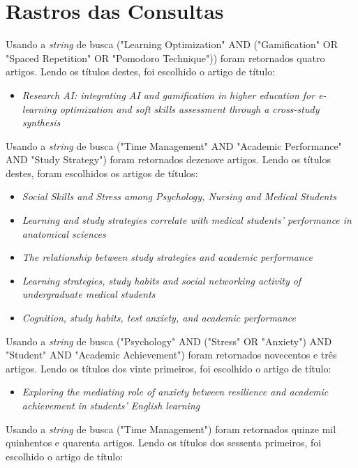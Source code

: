 \section{Rastros das Consultas}

Usando a \textit{string} de busca ("Learning Optimization" AND ("Gamification" OR "Spaced Repetition" OR "Pomodoro Technique")) foram retornados quatro artigos.
Lendo os títulos destes, foi escolhido o artigo de título:

\begin{itemize}
    \item \textit{Research AI: integrating AI and gamification in higher education for e-learning optimization and soft skills assessment through a cross-study synthesis}
\end{itemize}

Usando a \textit{string} de busca ("Time Management" AND "Academic Performance" AND "Study Strategy") foram retornados dezenove artigos.
Lendo os títulos destes, foram escolhidos os artigos de títulos:

\begin{itemize}
    \item \textit{Social Skills and Stress among Psychology, Nursing and Medical Students}
    \item \textit{Learning and study strategies correlate with medical students' performance in anatomical sciences}
    \item \textit{The relationship between study strategies and academic performance}
    \item \textit{Learning strategies, study habits and social networking activity of undergraduate medical students}
    \item \textit{Cognition, study habits, test anxiety, and academic performance}
\end{itemize}

Usando a \textit{string} de busca ("Psychology" AND ("Stress" OR "Anxiety") AND "Student" AND "Academic Achievement") foram retornados novecentos e três artigos.
Lendo os títulos dos vinte primeiros, foi escolhido o artigo de título:

\begin{itemize}
    \item \textit{Exploring the mediating role of anxiety between resilience and academic achievement in students' English learning}
\end{itemize}

Usando a \textit{string} de busca ("Time Management") foram retornados quinze mil quinhentos e quarenta artigos.
Lendo os títulos dos sessenta primeiros, foi escolhido o artigo de título:

